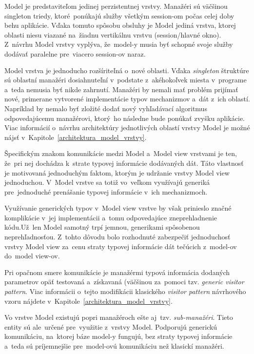 Model je predstaviteľom jedinej perzistentnej  vrstvy. Manažéri sú väčšinou singleton triedy, ktoré~ponúkajú služby všetkým session-om počas celej doby behu aplikácie. Vďaka tomuto spôsobu obsluhy je Model jediná vrstva, ktorej oblasti niesu viazané na~žiadnu vertikálnu vrstvu (session/hlavné okno). Z~návrhu Model vrstvy vyplýva, že~model-y musia byť schopné svoje služby dodávať paralelne pre~viacero session-ov naraz. 

Model vrstva je jednoducho rozšíriteľná o~nové oblasti. Vďaka \textit{singleton} štruktúre sú oblastní manažéri dosiahnuteľní v~podstate z~akéhokoľvek miesta v~programe a~teda nemusia byť nikde zahrnutí. Manažéri by nemali mať problém prijímať nové, primerane vytvorené implementácie typov mechanizmov a~dát z~ich oblastí. Napríklad by nemalo byť zložité dodať nový vyhľadávací algoritmus odpovedajúcemu manažérovi, ktorý~ho následne bude ponúkať zvyšku aplikácie. Viac informácií o~návrhu architektúry jednotlivých oblastí vrstvy Model je možné nájsť v~Kapitole~\ref{architektura_model_vrstvy}.

Špecifickým znakom komunikácie medzi Model a~Model view vrstvami je ten, že~pri nej dochádza k~strate typovej informácie dodávaných dát. Táto vlastnosť je motivovaná jednoduchým faktom, ktorým je udržanie vrstvy Model view jednoduchou. V~Model vrstve sa totiž vo~veľkom využívajú generiká pre~jednoduché prenášanie typovej informácie v~ich mechanizmoch. 

Využívanie generických typov v~Model view vrstve by však prinieslo značné komplikácie v~jej implementácii a~tomu odpovedajúce zneprehladnenie kódu.Už~len Model samotný trpí jemnou, generikami spôsobenou neprehľadnosťou. Z~tohto dôvodu bolo rozhodnuté zabezpečiť jednoduchosť vrstvy Model view za~cenu straty typovej informácie dát tečúcich z~model-ov do~model view-ov. 

Pri opačnom smere komunikácie je manažérmi typová informácia dodaných parametrov opäť testovaná a~získavaná (väčšinou za~pomoci tzv. \textit{generic visitor pattern}. Viac informácii o~tejto modifikácii klasického \textit{visitor pattern} návrhového vzoru nájdete v~Kapitole~\ref{architektura_model_vrstvy}.

Vo vrstve Model existujú popri manažéroch ešte aj~tzv. \textit{sub-manažéri}. Tieto entity sú ale~určené pre~využitie z~vrstvy Model. Podporujú generickú komunikáciu, na~ktorej báze model-y fungujú, bez straty typovej informácie a~teda sú príjemnejšie pre~model-ovú komunikáciu než klasickí manažéri.     

